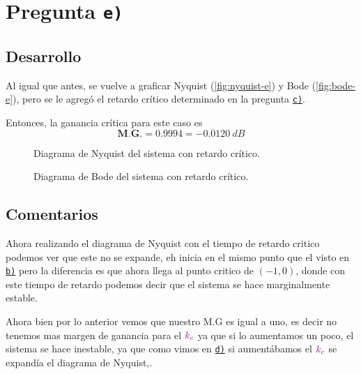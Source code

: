 \section{Pregunta \texttt{e)}}\label{pregunta-e}

\subsection{Desarrollo}

Al igual que antes, se vuelve a graficar Nyquist (\autoref{fig:nyquist-e}) y
Bode (\autoref{fig:bode-e}), pero se le agregó el retardo crítico determinado
en la pregunta \hyperref[pregunta-c]{\texttt{c)}}.

Entonces, la ganancia crítica para este caso es
\begin{equation}
  \boxed{\textbf{M.G.} = 0.9994 = -0.0120\ \unit{dB}}
\end{equation}

\begin{figure}[h]
  \centering
  
  \caption{Diagrama de Nyquist del sistema con retardo crítico.}
  \label{fig:nyquist-e}
\end{figure}

\begin{figure}[h]
  \centering
  
  \caption{Diagrama de Bode del sistema con retardo crítico.}
  \label{fig:bode-e}
\end{figure}


\FloatBarrier
\subsection{Comentarios}


Ahora realizando el diagrama de Nyquist con el tiempo de retardo critico podemos ver que este no se expande, eh inicia en el mismo punto que el visto en \hyperref[pregunta-c]{\texttt{b)}} pero la diferencia es que ahora llega al punto critico de \((-1,0)\), donde con este tiempo de retardo podemos decir que el sistema se hace marginalmente estable. 

Ahora bien por lo anterior vemos que nuestro M.G es igual a uno, es decir no tenemos mas margen de ganancia para el \(\mathbin{\color{violet}k_c}\) ya que si lo aumentamos un poco, el sistema se hace inestable, ya que como vimos en \hyperref[pregunta-c]{\texttt{d)}} si aumentábamos el \(\mathbin{\color{violet}k_c}\) se expandía el diagrama de Nyquist,.



